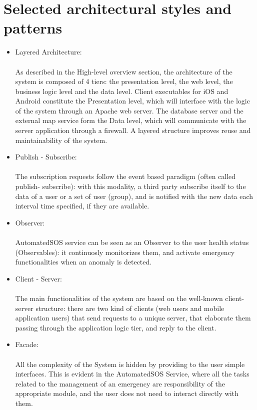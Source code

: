 \section{Selected architectural styles and patterns}

\begin{itemize}
    \item Layered Architecture:\\ \\
    As described in the High-level overview section, the architecture of the system is composed of 4 tiers: the presentation level, the web level, the business logic level and the data level. Client executables for iOS and Android constitute the Presentation level, which will interface with the logic of the system through an Apache web server. The database server and the external map service form the Data level, which will communicate with the server application through a firewall. A layered structure improves reuse and maintainability of the system.
    \item Publish - Subscribe: \\ \\
    The subscription requests follow the event based paradigm (often called publish- subscribe): with this modality, a third party subscribe itself to the data of a user or a set of user (group), and is notified with the new data each interval time specified, if they are available.
    \item Observer: \\ \\
    AutomatedSOS service can be seen as an Observer to the user health status (Observables): it continuosly monitorizes them, and activate emergency functionalities when an anomaly is detected.
    \item Client - Server: \\ \\
    The main functionalities of the system are based on the well-known client- server structure: there are two kind of clients (web users and mobile application users) that send requests to a unique server, that elaborate them passing through the application logic tier, and reply to the client.

\item Facade: \\ \\
All the complexity of the System is hidden by providing to the user simple interfaces. This is evident in the AutomatedSOS Service, where all the tasks related to the management of an emergency are responsibility of the appropriate module, and the user does not need to interact directly with them.
\end{itemize}